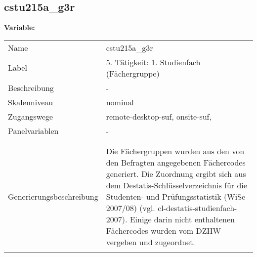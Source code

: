 	
	
	\subsection{cstu215a\_g3r}
	\label{subSection:cstu215a_g3r}

	\noindent\textbf{Variable:}\\
		\begin{tabular}{lL{11.3cm}}
			\label{tableVariable:cstu215a_g3r}
			Name & cstu215a\_g3r \\
			Label & 5. Tätigkeit: 1. Studienfach (Fächergruppe) \\
			Beschreibung & - \\
			Skalenniveau & nominal \\
			Zugangswege &
				remote-desktop-suf,
				onsite-suf,
 \\
			Panelvariablen & -
			 \\
			 \\
 \\
					Generierungsbeschreibung & Die Fächergruppen wurden aus den von den Befragten angegebenen Fächercodes generiert. Die Zuordnung ergibt sich aus dem Destatis-Schlüsselverzeichnis für die Studenten- und Prüfungsstatistik (WiSe 2007/08) (vgl. cl-destatis-studienfach-2007).  Einige darin nicht enthaltenen Fächercodes wurden vom DZHW vergeben und zugeordnet. 
				 \\	
			 \\
		\end{tabular}






